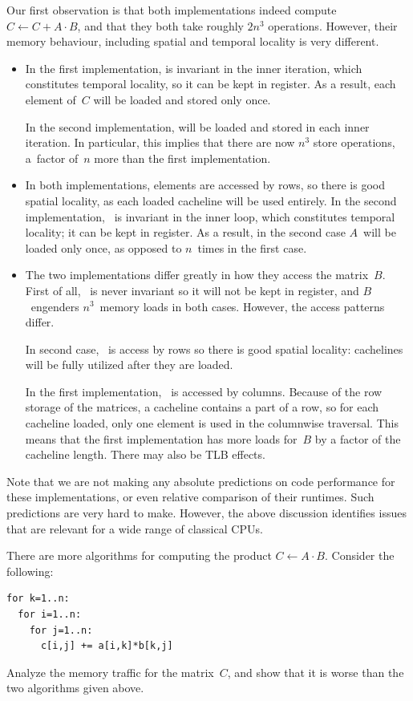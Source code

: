 Our first observation is that both implementations
indeed compute $C\leftarrow
C+A\cdot B$, and that they both take roughly $2n^3$
operations. However, their memory behaviour, including spatial and
temporal locality is very different.
\begin{itemize}
\item[\n{c[i,j]}] In the first implementation,  is
  invariant in the inner iteration, which constitutes temporal
  locality,
  so it can be kept in register. As
  a result, each element of~$C$ will be loaded and stored only once.

  In the second implementation,  will be loaded and stored
  in each inner iteration. In particular, this implies that there are
  now $n^3$ store operations, a~factor of~$n$ more than the first
  implementation.
\item[\n{a[i,k]}] In both implementations,  elements are
  accessed by rows, so there is good spatial locality, as each loaded
  cacheline will be used entirely. In the second implementation,
  ~is invariant in the inner loop, which constitutes
  temporal locality; it can be kept in register. As a result, in the
  second case $A$~will be loaded only once, as opposed to $n$~times in
  the first case.
\item[\n{b[k,j]}] The two implementations differ greatly in how they
  access the matrix~$B$. First of all, ~is never invariant
  so it will not be kept in register, and $B$~engenders $n^3$~memory
  loads in both cases. However, the access patterns differ.

  In second case, ~is access by rows
  so there is good spatial locality: cachelines will be fully utilized
  after they are loaded. 

  In the first implementation, ~is accessed by
  columns. Because of the row storage of the matrices, a cacheline contains
  a part of a row, so for each cacheline loaded, only one element is
  used in the columnwise traversal. This means that the first
  implementation has more loads for~$B$ by a factor of the cacheline
  length. There may also be TLB effects.
\end{itemize}
Note that we are not making any absolute predictions on code
performance for these implementations, or even relative comparison of
their runtimes. Such predictions are very hard to make. However, the
above discussion identifies issues that are relevant for a wide range
of classical CPUs.

\begin{exercise}
  There are more algorithms for computing the product $C\leftarrow
  A\cdot B$. Consider the following:
\begin{verbatim}
for k=1..n:
  for i=1..n:
    for j=1..n:
      c[i,j] += a[i,k]*b[k,j]
\end{verbatim}
Analyze the memory traffic for the matrix~$C$, and show that it is
worse than the two algorithms given above.
\end{exercise}

